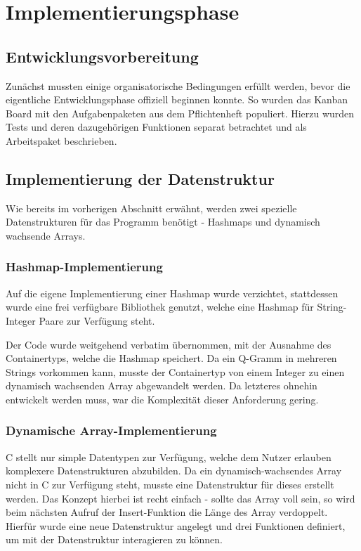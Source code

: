\section{Implementierungsphase}
\label{section:implementierungsphase}
\subsection{Entwicklungsvorbereitung}
Zunächst mussten einige organisatorische Bedingungen erfüllt werden, bevor die eigentliche Entwicklungsphase offiziell beginnen konnte. So wurden das Kanban Board mit den
Aufgabenpaketen aus dem Pflichtenheft populiert. Hierzu wurden Tests und deren
dazugehörigen Funktionen separat betrachtet und als Arbeitspaket beschrieben.

\subsection{Implementierung der Datenstruktur}
Wie bereits im vorherigen Abschnitt erwähnt, werden zwei spezielle Datenstrukturen für das Programm benötigt - Hashmaps und dynamisch wachsende Arrays.

\subsubsection{Hashmap-Implementierung}


Auf die eigene Implementierung einer Hashmap wurde verzichtet, stattdessen wurde
eine frei verfügbare Bibliothek genutzt, welche eine Hashmap für
String-Integer Paare zur Verfügung steht.

Der Code wurde weitgehend verbatim übernommen, mit der Ausnahme des
Containertyps, welche die Hashmap speichert. Da ein Q-Gramm in mehreren Strings
vorkommen kann, musste der Containertyp von einem Integer zu einen dynamisch
wachsenden Array abgewandelt werden. Da letzteres ohnehin entwickelt werden muss,
war die Komplexität dieser Anforderung gering.

\subsubsection{Dynamische Array-Implementierung}
C stellt nur simple Datentypen zur Verfügung, welche dem Nutzer erlauben komplexere
Datenstrukturen abzubilden. Da ein dynamisch-wachsendes
Array nicht in C zur Verfügung steht, musste eine Datenstruktur für dieses erstellt werden.
Das Konzept hierbei ist recht einfach - sollte das Array voll sein, so wird beim
nächsten Aufruf der Insert-Funktion die Länge des Array verdoppelt. Hierfür wurde
eine neue Datenstruktur angelegt und drei Funktionen definiert, um mit der Datenstruktur
interagieren zu können.\par

